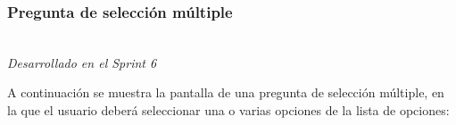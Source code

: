 \newpage

\subsubsection{Pregunta de selección múltiple}\mbox{}\\

\label{sec:pregunic1}
\textit{Desarrollado en el Sprint 6}

A continuación se muestra la pantalla de una pregunta de selección múltiple, en la que el usuario deberá seleccionar una o varias opciones de la lista de opciones:

\begin{figure}[H]%
  \centering
  \qquad

\end{figure}
